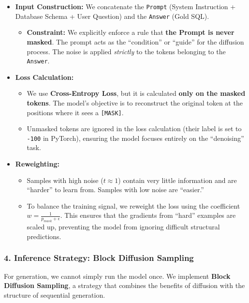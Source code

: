 \documentclass[a4paper,12pt]{article}
\begin{document}
\begin{itemize}
    \item \textbf{Input Construction:} We concatenate the \texttt{Prompt} (System Instruction + Database Schema + User Question) and the \texttt{Answer} (Gold SQL).
    \begin{itemize}
        \item \textbf{Constraint:} We explicitly enforce a rule that \textbf{the Prompt is never masked}. The prompt acts as the ``condition'' or ``guide'' for the diffusion process. The noise is applied \textit{strictly} to the tokens belonging to the \texttt{Answer}.
    \end{itemize}
    
    \item \textbf{Loss Calculation:}
    \begin{itemize}
        \item We use \textbf{Cross-Entropy Loss}, but it is calculated \textbf{only on the masked tokens}. The model's objective is to reconstruct the original token at the positions where it sees a \texttt{[MASK]}.
        \item Unmasked tokens are ignored in the loss calculation (their label is set to \texttt{-100} in PyTorch), ensuring the model focuses entirely on the ``denoising'' task.
    \end{itemize}
    
    \item \textbf{Reweighting:}
    \begin{itemize}
        \item Samples with high noise ($t \approx 1$) contain very little information and are ``harder'' to learn from. Samples with low noise are ``easier.''
        \item To balance the training signal, we reweight the loss using the coefficient $w = \frac{1}{p_{mask} + \epsilon}$. This ensures that the gradients from ``hard'' examples are scaled up, preventing the model from ignoring difficult structural predictions.
    \end{itemize}
\end{itemize}

\subsubsection{4. Inference Strategy: Block Diffusion Sampling}

For generation, we cannot simply run the model once. We implement \textbf{Block Diffusion Sampling}, a strategy that combines the benefits of diffusion with the structure of sequential generation.
\end{document}
